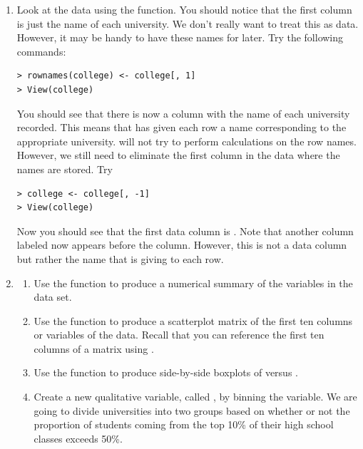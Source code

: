\documentclass[12pt]{report}
\begin{document}
\begin{exercise}
\begin{enumerate}
    \item[(b)] Look at the data using the  function. You should notice that the first column is just the name of each university. We don't really want  to treat this as data. However, it may be handy to have these names for later. Try the following commands:

\begin{lstlisting}
> rownames(college) <- college[, 1]
> View(college)
\end{lstlisting}

    You should see that there is now a  column with the name of each university recorded. This means that  has given each row a name corresponding to the appropriate university.  will not try to perform calculations on the row names. However, we still need to eliminate the first column in the data where the names are stored. Try

\begin{lstlisting}
> college <- college[, -1]
> View(college)
\end{lstlisting}

    Now you should see that the first data column is . Note that another column labeled  now appears before the  column. However, this is not a data column but rather the name that  is giving to each row.

    \item[(c)] 
    \begin{enumerate}
        \item[i.] Use the  function to produce a numerical summary of the variables in the data set.
        
        \item[ii.] Use the  function to produce a scatterplot matrix of the first ten columns or variables of the data. Recall that you can reference the first ten columns of a matrix  using .
        
        \item[iii.] Use the  function to produce side-by-side boxplots of  versus .
        
        \item[iv.] Create a new qualitative variable, called , by binning the  variable. We are going to divide universities into two groups based on whether or not the proportion of students coming from the top 10\% of their high school classes exceeds 50\%.


\end{enumerate}
\end{enumerate}
\end{exercise}
\end{document}
